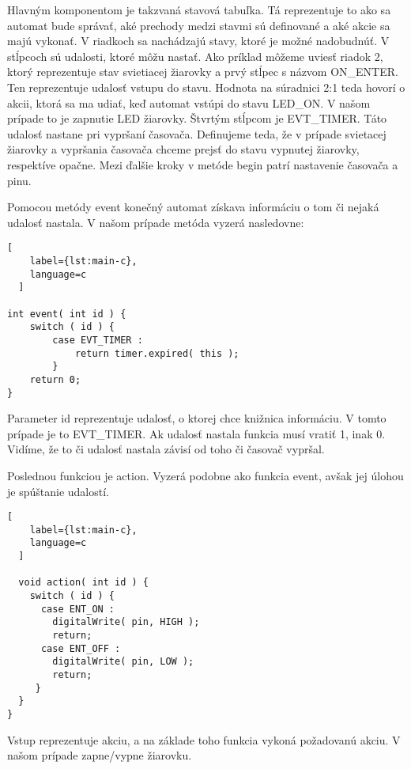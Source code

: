 Hlavným komponentom je takzvaná stavová tabuľka. Tá reprezentuje to ako sa automat bude správať, aké prechody medzi stavmi sú definované a aké akcie sa majú vykonať. V riadkoch sa nachádzajú stavy, ktoré je možné nadobudnúť. V stĺpcoch sú udalosti, ktoré môžu nastať. Ako príklad môžeme uviesť riadok 2, ktorý reprezentuje stav svietiacej žiarovky a prvý stĺpec s názvom ON\_ENTER. Ten reprezentuje udalosť vstupu do stavu. Hodnota na súradnici 2:1 teda hovorí o  akcii, ktorá sa ma udiať, keď automat vstúpi do stavu LED\_ON. V našom prípade to je zapnutie LED žiarovky. Štvrtým stĺpcom je EVT\_TIMER. Táto udalosť nastane pri vypršaní časovača. Definujeme teda, že v prípade svietacej žiarovky a vypršania časovača chceme prejsť do stavu vypnutej žiarovky, respektíve opačne.  Mezi ďalšie kroky v metóde begin patrí nastavenie časovača a pinu.
\par Pomocou metódy event konečný automat získava informáciu o tom či nejaká udalosť nastala. V našom prípade metóda vyzerá nasledovne:
\begin{lstlisting}[
    label={lst:main-c},
    language=c
  ]

int event( int id ) {
    switch ( id ) {
        case EVT_TIMER :
            return timer.expired( this );        
        }
    return 0;
}
\end{lstlisting}
Parameter id reprezentuje udalosť, o ktorej chce knižnica informáciu. V tomto prípade je to EVT\_TIMER. Ak udalosť nastala funkcia musí vratiť 1, inak 0. Vidíme, že to či udalosť nastala závisí od toho či časovač vypršal. 
\par Poslednou funkciou je action. Vyzerá podobne ako funkcia event, avšak jej úlohou je spúštanie udalostí. 
\begin{lstlisting}[
    label={lst:main-c},
    language=c
  ]

  void action( int id ) {
    switch ( id ) {
      case ENT_ON :
        digitalWrite( pin, HIGH );
        return;
      case ENT_OFF :
        digitalWrite( pin, LOW );
        return;
     }
  }
}
\end{lstlisting}
Vstup reprezentuje akciu, a na základe toho funkcia vykoná požadovanú akciu. V našom prípade zapne/vypne žiarovku.


